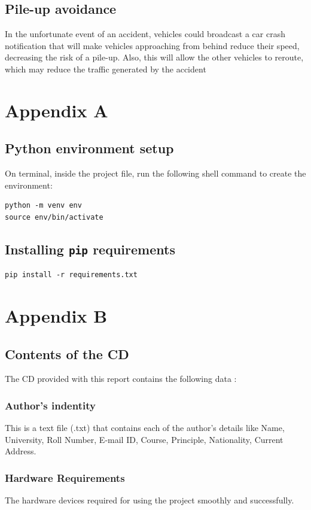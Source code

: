 \documentclass[11pt]{article}
\begin{document}
\subsection{Pile-up avoidance}
\label{sec:org017c076}
In the unfortunate event of an accident, vehicles could broadcast a car crash
notification that will make vehicles approaching from behind reduce their speed,
decreasing the risk of a pile-up. Also, this will allow the other vehicles to reroute,
which may reduce the traffic generated by the accident
\clearpage
\section{Appendix A}
\label{sec:org1c7b215}
\subsection{Python environment setup}
\label{sec:org6b49827}
On terminal, inside the project file, run the following shell command to create the environment:
\begin{verbatim}
python -m venv env
source env/bin/activate
\end{verbatim}
\subsection{Installing \texttt{pip} requirements}
\label{sec:org32e1991}
\begin{verbatim}
pip install -r requirements.txt
\end{verbatim}
\clearpage
\section{Appendix B}
\label{sec:org93f1d1d}
\subsection{Contents of the CD}
\label{sec:org20cd80b}
The CD provided with this report contains the following data :
\subsubsection{Author's indentity}
\label{sec:org8065e87}
This is a text file (.txt) that contains each of the author’s details like Name, University,
Roll Number, E-mail ID, Course, Principle, Nationality, Current Address.
\subsubsection{Hardware Requirements}
\label{sec:org60f22df}
The hardware devices required for using the project smoothly and successfully.
\end{document}
